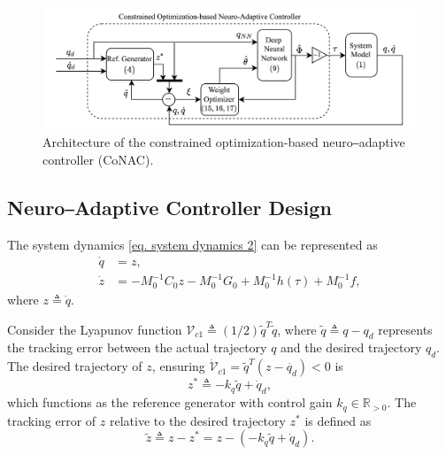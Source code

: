 \documentclass[lettersize,journal]{IEEEtran}
\begin{document}
\begin{figure}[!t]
    \centering
    \includegraphics[width=0.7\linewidth]{Controller.drawio.png}
    \caption{Architecture of the constrained optimization-based neuro‒adaptive controller (CoNAC).}
    \label{fig: controller}
\end{figure}

\subsection{Neuro‒Adaptive Controller Design}\label{sec:NAC}

The system dynamics \eqref{eq. system dynamics 2} can be represented as
\begin{equation}
    \begin{aligned}
        \dot {q} &= {z},\\
        \dot {z} &= -M_0^{-1} C_0 {z}-M_0^{-1} G_0+M_0^{-1} h(\tau) + M_0^{-1} f,
    \end{aligned}
    \label{eq. x dynamics}
\end{equation}
where ${z}\triangleq \dot q$.

Consider the Lyapunov function ${\mathcal V}_{c1}\triangleq(1/2){\tilde q}^T  {\tilde q}$, where ${\tilde q}\triangleq {q}-{q_d}$ represents the tracking error between the actual trajectory ${q}$ and the desired trajectory $q_d$. 
The desired trajectory of ${z}$, ensuring $\dot {\mathcal V}_{c1}={\tilde q}^T  ({z}-\dot {q_d})<0$ is 
\begin{equation}
    {z^*} \triangleq -{k_q}{\tilde q} + \dot q_d,
\end{equation}
which functions as the reference generator with control gain ${k_q} \in\mathbb{R}_{>0}$. The tracking error of ${z}$ relative to the desired trajectory ${z^*}$ is defined as
\begin{equation}
    {\tilde z} \triangleq {z} - {z^*} = {z} - (-{k_q}{\tilde q} + \dot q_d).
    \label{eq. e2}
\end{equation}
\end{document}
